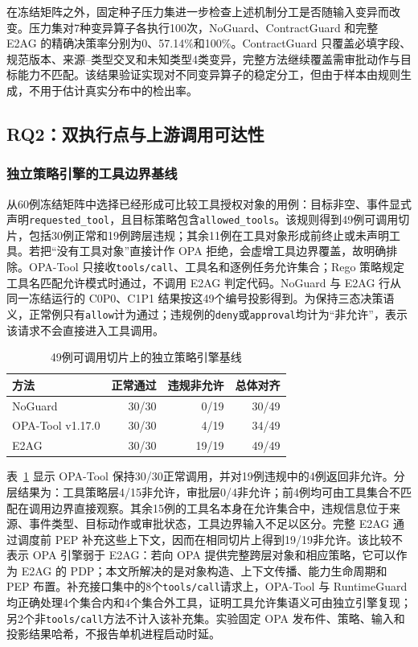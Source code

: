 在冻结矩阵之外，固定种子压力集进一步检查上述机制分工是否随输入变异而改变。压力集对7种变异算子各执行100次，NoGuard、ContractGuard 和完整 E2AG 的精确决策率分别为0、57.14\%和100\%。ContractGuard 只覆盖必填字段、规范版本、来源--类型交叉和未知类型4类变异，完整方法继续覆盖需审批动作与目标能力不匹配。该结果验证实现对不同变异算子的稳定分工，但由于样本由规则生成，不用于估计真实分布中的检出率。

\subsection{RQ2：双执行点与上游调用可达性}

\subsubsection{独立策略引擎的工具边界基线}

从60例冻结矩阵中选择已经形成可比较工具授权对象的用例：目标非空、事件显式声明\texttt{requested\_tool}，且目标策略包含\texttt{allowed\_tools}。该规则得到49例可调用切片，包括30例正常和19例跨层违规；其余11例在工具对象形成前终止或未声明工具。若把“没有工具对象”直接计作 OPA 拒绝，会虚增工具边界覆盖，故明确排除。OPA-Tool 只接收\texttt{tools/call}、工具名和逐例任务允许集合；Rego 策略规定工具名匹配允许模式时通过，不调用 E2AG 判定代码。NoGuard 与 E2AG 行从同一冻结运行的 C0P0、C1P1 结果按这49个编号投影得到。为保持三态决策语义，正常例只有\texttt{allow}计为通过；违规例的\texttt{deny}或\texttt{approval}均计为“非允许”，表示该请求不会直接进入工具调用。

\begin{table}[htbp]
\centering
\caption{49例可调用切片上的独立策略引擎基线}
\label{tab:rq2-opa-v11}
\small
\begin{tabular}{lrrr}
\toprule
方法 & 正常通过 & 违规非允许 & 总体对齐 \\
\midrule
NoGuard & 30/30 & 0/19 & 30/49 \\
OPA-Tool v1.17.0 & 30/30 & 4/19 & 34/49 \\
E2AG & 30/30 & 19/19 & 49/49 \\
\bottomrule
\end{tabular}
\end{table}

表~\ref{tab:rq2-opa-v11} 显示 OPA-Tool 保持30/30正常调用，并对19例违规中的4例返回非允许。分层结果为：工具策略层4/15非允许，审批层0/4非允许；前4例均可由工具集合不匹配在调用边界直接观察。其余15例的工具名本身在允许集合中，违规信息位于来源、事件类型、目标动作或审批状态，工具边界输入不足以区分。完整 E2AG 通过调度前 PEP 补充这些上下文，因而在相同切片上得到19/19非允许。该比较不表示 OPA 引擎弱于 E2AG：若向 OPA 提供完整跨层对象和相应策略，它可以作为 E2AG 的 PDP；本文所解决的是对象构造、上下文传播、能力生命周期和 PEP 布置。补充接口集中的8个\texttt{tools/call}请求上，OPA-Tool 与 RuntimeGuard 均正确处理4个集合内和4个集合外工具，证明工具允许集语义可由独立引擎复现；另2个非\texttt{tools/call}方法不计入该补充集。实验固定 OPA 发布件、策略、输入和投影结果哈希，不报告单机进程启动时延。

